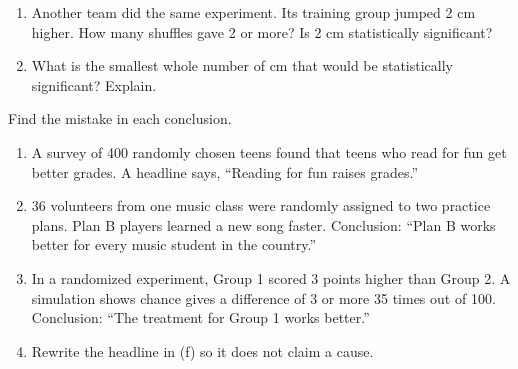 \documentclass[11pt]{article}
\begin{document}
\begin{enumerate}[resume]
\vspace{0.6em}
\begin{enumerate}[start=4,itemsep=0.9em]
  \item Another team did the same experiment. Its training group jumped 2 cm higher. How many shuffles gave 2 or more? Is 2 cm statistically significant?

  \work{2.5em}
  \item What is the smallest whole number of cm that would be statistically significant? Explain.

  \work{2.5em}
\end{enumerate}

\vspace{0.3em}
Find the mistake in each conclusion.
\begin{enumerate}[start=6,itemsep=0.9em]
  \item A survey of 400 randomly chosen teens found that teens who read for fun get better grades. A headline says, ``Reading for fun raises grades.''

  \work{2.5em}
  \item 36 volunteers from one music class were randomly assigned to two practice plans. Plan B players learned a new song faster. Conclusion: ``Plan B works better for every music student in the country.''

  \work{2.5em}
  \item In a randomized experiment, Group 1 scored 3 points higher than Group 2. A simulation shows chance gives a difference of 3 or more 35 times out of 100. Conclusion: ``The treatment for Group 1 works better.''

  \work{2.5em}
  \item Rewrite the headline in (f) so it does not claim a cause.

  \ifkey\else\par\rule{0pt}{2.6em}\fi
\end{enumerate}

\end{enumerate}
\end{document}
